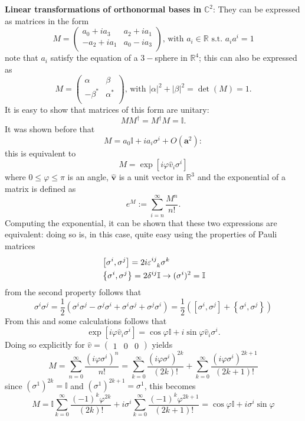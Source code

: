 \textbf{Linear transformations of orthonormal bases in} $\mathbb{C}^2$: They can be
expressed as matrices in the form
$$M=\begin{pmatrix}
a_0+ia_3&a_2+ia_1\\
-a_2+ia_1&a_0-ia_3\\
\end{pmatrix}\text{, with }a_i\in\mathbb{R} \text{ s.t. } a_ia^i = 1
$$
note that $a_i$ satisfy the equation of a $3-$sphere in $\mathbb{R}^4$; this can
also be expressed as
$$M=\begin{pmatrix}
\alpha&\beta\\
-\beta^*&\alpha^*\\
\end{pmatrix}\text{, with }|\alpha|^2+|\beta|^2=\det(M)=1.
$$
It is easy to show that matrices of this form are unitary:
$$MM^\dagger = M^\dagger M = \mathbb{I}.$$
It was shown before that
$$M = a_0\mathbb{I} + ia_i\sigma^i+ O(\mathbf{a}^2):$$
this is equivalent to
$$M = \exp\left[i\varphi\hat v_i\sigma^i\right]$$
where $0\leq\varphi\leq\pi$ is an angle, $\mathbf{\hat v}$ is a unit vector in
$\mathbb{R}^3$ and the exponential of a matrix is defined as
$$e^M:=\sum_{i=n}^{\infty}\frac{M^n}{n!}.$$
Computing the exponential, it can be shown that these two expressions are equivalent:
doing so is, in this case, quite easy using the properties of Pauli
matrices
\begin{align*}
&\left[\sigma^i,\sigma^j\right] = 2i\varepsilon\indices{^i^j_k}\sigma^k\\
&\left\{\sigma^i,\sigma^j\right\} = 2\delta^{ij}\mathbb{I}\rightarrow
(\sigma^i)^2 = \mathbb{I}
\end{align*}
from the second property follows that
$$\sigma^i\sigma^j = \frac{1}{2}\left(
\sigma^i\sigma^j-\sigma^j\sigma^i+\sigma^i\sigma^j+\sigma^j\sigma^i\right)=
\frac{1}{2}\left(\left[\sigma^i,\sigma^j\right]+\left\{\sigma^i,\sigma^j\right\}
\right)$$
From this and some calculations follows that
$$\exp\left[i\varphi\hat v_i\sigma^i\right] = \cos\varphi\mathbb{I}+
i\sin\varphi\hat v_i\sigma^i.
$$
Doing so explicitly for $\hat v = \begin{pmatrix}1&0&0\end{pmatrix}$ yields
$$M = \sum_{n=0}^{\infty}\frac{(i\varphi\sigma^i)^n}{n!} = 
\sum_{k=0}^{\infty}\frac{(i\varphi\sigma^i)^{2k}}{(2k)!}+
\sum_{k=0}^{\infty}\frac{(i\varphi\sigma^i)^{2k+1}}{(2k+1)!}$$
since $(\sigma^1)^{2k}=\mathbb{I}$ and $(\sigma^1)^{2k+1}=\sigma^1$, this becomes
$$M = \mathbb{I}\sum_{k=0}^{\infty}\frac{(-1)^{k}\varphi^{2k}}{(2k)!} +
i\sigma^i\sum_{k=0}^{\infty}\frac{(-1)^k\varphi^{2k+1}}{(2k+1)!} =
\cos\varphi\mathbb{I}+i\sigma^i\sin\varphi$$

